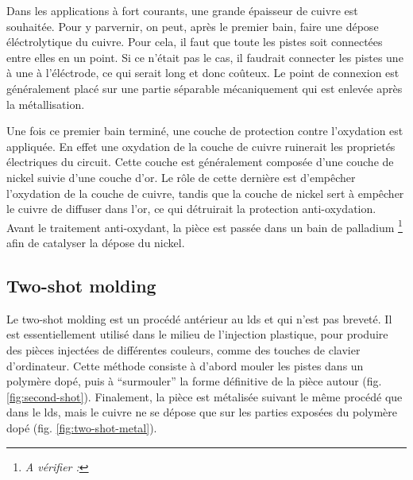 Dans les applications à fort courants, une grande épaisseur de cuivre est souhaitée.
Pour y parvernir, on peut, après le premier bain, faire une dépose éléctrolytique du cuivre.
Pour cela, il faut que toute les pistes soit connectées entre elles en un point.
Si ce n'était pas le cas, il faudrait connecter les pistes une à une à l'éléctrode, ce qui serait long et donc coûteux.
Le point de connexion est généralement placé sur une partie séparable mécaniquement qui est enlevée après la métallisation.

Une fois ce premier bain terminé, une couche de protection contre l'oxydation est appliquée.
En effet une oxydation de la couche de cuivre ruinerait les proprietés électriques du circuit.
Cette couche est généralement composée d'une couche de nickel suivie d'une couche d'or.
Le rôle de cette dernière est d'empêcher l'oxydation de la couche de cuivre, tandis que la couche de nickel sert à empêcher le cuivre de diffuser dans l'or, ce qui détruirait la protection anti-oxydation.
Avant le traitement anti-oxydant, la pièce est passée dans un bain de palladium \footnote{\emph{A vérifier :} } afin de catalyser la dépose du nickel.

\subsection{Two-shot molding}
Le two-shot molding est un procédé antérieur au \gls{lds} et qui n'est pas breveté.
Il est essentiellement utilisé dans le milieu de l'injection plastique, pour produire des pièces injectées de différentes couleurs, comme des touches de clavier d'ordinateur.
Cette méthode consiste à d'abord mouler les pistes dans un polymère dopé, puis à ``surmouler'' la forme définitive de la pièce autour (fig. \ref{fig:second-shot}).
Finalement, la pièce est métalisée suivant le même procédé que dans le \gls{lds}, mais le cuivre ne se dépose que sur les parties exposées du polymère dopé (fig. \ref{fig:two-shot-metal}).


